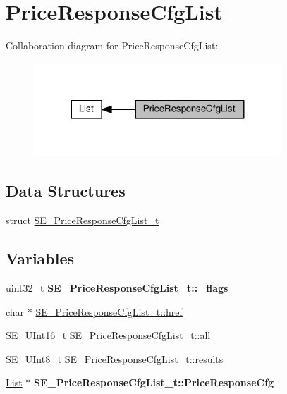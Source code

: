 \hypertarget{group__PriceResponseCfgList}{}\section{Price\+Response\+Cfg\+List}
\label{group__PriceResponseCfgList}
Collaboration diagram for Price\+Response\+Cfg\+List\+:\nopagebreak
\begin{figure}[H]
\begin{center}
\leavevmode
\includegraphics[width=263pt]{group__PriceResponseCfgList}
\end{center}
\end{figure}
\subsection*{Data Structures}
\begin{DoxyCompactItemize}
\item 
struct \hyperlink{structSE__PriceResponseCfgList__t}{S\+E\+\_\+\+Price\+Response\+Cfg\+List\+\_\+t}
\end{DoxyCompactItemize}
\subsection*{Variables}
\begin{DoxyCompactItemize}
\item 
\mbox{\label{group__PriceResponseCfgList_gae45407b34d0195328a58ac7a1140b4d7}} 
uint32\+\_\+t {\bfseries S\+E\+\_\+\+Price\+Response\+Cfg\+List\+\_\+t\+::\+\_\+flags}
\item 
char $\ast$ \hyperlink{group__PriceResponseCfgList_gaafcdf8624acc281dbf337e52d3ba7920}{S\+E\+\_\+\+Price\+Response\+Cfg\+List\+\_\+t\+::href}
\item 
\hyperlink{group__UInt16_gac68d541f189538bfd30cfaa712d20d29}{S\+E\+\_\+\+U\+Int16\+\_\+t} \hyperlink{group__PriceResponseCfgList_gafc25afa368784ecc6e17e2ff3859e3df}{S\+E\+\_\+\+Price\+Response\+Cfg\+List\+\_\+t\+::all}
\item 
\hyperlink{group__UInt8_gaf7c365a1acfe204e3a67c16ed44572f5}{S\+E\+\_\+\+U\+Int8\+\_\+t} \hyperlink{group__PriceResponseCfgList_gafd624b9ac0b68ef68e109fea294cfda0}{S\+E\+\_\+\+Price\+Response\+Cfg\+List\+\_\+t\+::results}
\item 
\mbox{\label{group__PriceResponseCfgList_ga4d7763c906309c0e520c32d4d36a0f43}} 
\hyperlink{structList}{List} $\ast$ {\bfseries S\+E\+\_\+\+Price\+Response\+Cfg\+List\+\_\+t\+::\+Price\+Response\+Cfg}
\end{DoxyCompactItemize}


